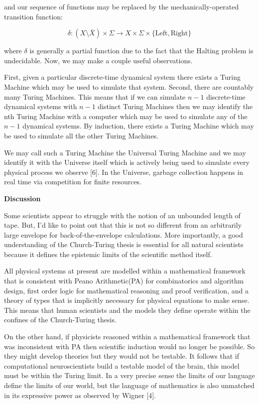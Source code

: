 \documentclass{article}
\begin{document}
and our sequence of functions may be replaced by the mechanically-operated transition function:

\begin{equation}
\delta : (X \setminus \bar{X}) \times \Sigma \rightarrow X \times \Sigma \times \{\textrm{Left}, \textrm{Right}\}
\end{equation}

where $\delta$ is generally a partial function due to the fact that the Halting problem is undecidable. Now, we may make a couple useful observations.

First, given a particular discrete-time dynamical system there exists a Turing Machine which may be used to simulate that
system. Second, there are countably many Turing Machines. This means that if we can simulate $n-1$ discrete-time dynamical systems with $n-1$ distinct Turing Machines then we may identify the nth Turing Machine with a computer which may be used
to simulate any of the $n-1$ dynamical systems. By induction, there exists a Turing Machine which may be used to simulate all the other Turing Machines.

We may call such a Turing Machine the Universal Turing Machine and we may identify it with the Universe itself which is
actively being used to simulate every physical process we observe [6]. In the Universe, garbage collection happens in real time via competition for finite resources.

\newpage 

\textbf{Discussion}

Some scientists appear to struggle with the notion of an unbounded length of tape. But, I'd like to point out that this is not so different from an arbitrarily large envelope for back-of-the-envelope calculations. More importantly, a good understanding of the Church-Turing thesis is essential for all natural scientists because it defines
the epistemic limits of the scientific method itself.

All physical systems at present are modelled within a mathematical framework that is consistent with Peano
Arithmetic(PA) for combinatorics and algorithm design, first order logic for mathematical reasoning and
proof verification, and a theory of types that is implicitly necessary for physical equations to make sense.
This means that human scientists and the models they define operate within the confines of the Church-Turing thesis.

On the other hand, if physicists reasoned within a mathematical framework that was inconsistent with PA then scientific
induction would no longer be possible. So they might develop theories but they would not be testable. It follows that if computational neuroscientists build a testable model of the brain, this model must be within the
Turing limit. In a very precise sense the limits of our language define the limits of our world, but the language of
mathematics is also unmatched in its expressive power as observed by Wigner [4].
\end{document}

